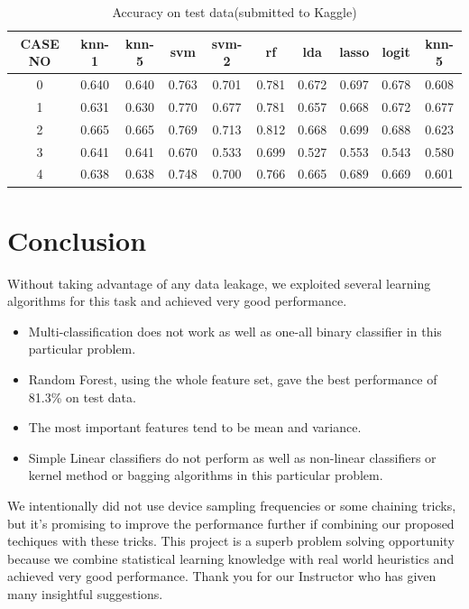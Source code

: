 \documentclass[11pt,letterpaper]{article}
\newcommand{\blue}[1]{\textcolor{RoyalBlue}{#1}}
\newcommand{\instructions}[1]{\blue{\textit{#1}}}
\begin{document}
	\begin{table}
	\centering
	\caption{Accuracy on test data(submitted to Kaggle)}
	\begin{tabular}{|c|c|c|c|c|c|c|c|c|c|}
	\hline
	CASE NO	& knn-1	& knn-5	& svm	& svm-2	& rf	& lda	& lasso &	logit	& knn-5 \\ \hline
0	& 0.640 & 0.640	& 0.763 &	0.701	& 0.781	& 0.672 &	0.697	& 0.678 & 0.608 \\ \hline
1	& 0.631	 & 0.630	& 0.770	& 0.677	& 0.781	& 0.657	& 0.668	& 0.672	& 0.677 \\ \hline
2	& 0.665 & 0.665	& 0.769	& 0.713	& 0.812	& 0.668	& 0.699	& 0.688	& 0.623 \\ \hline
3	& 0.641	& 0.641	& 0.670	& 0.533	& 0.699	& 0.527	& 0.553	& 0.543	& 0.580 \\ \hline
4	& 0.638	& 0.638	& 0.748	& 0.700	& 0.766	& 0.665	& 0.689	& 0.669	& 0.601 \\ \hline
	\end{tabular}
	\end{table}
\section{Conclusion}
Without taking advantage of any data leakage, we exploited several learning algorithms for this task and achieved very good performance.
\begin{itemize}
\item Multi-classification does not work as well as one-all binary classifier in this particular problem. 
\item Random Forest, using the whole feature set, gave the best performance of 81.3\% on test data.
\item The most important features tend to be mean and variance.
\item Simple Linear classifiers do not perform as well as non-linear classifiers or kernel method or bagging algorithms in this particular problem.
\end{itemize}
We intentionally did not use device sampling frequencies or some chaining tricks, but it's promising to improve the performance further if combining our proposed techiques with these tricks. This project is a superb problem solving opportunity because we combine statistical learning knowledge with real world heuristics and achieved very good performance. Thank you for our Instructor who has given many insightful suggestions.


%  
%
\end{document}
